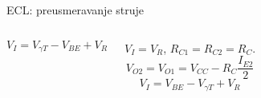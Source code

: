 \begin{frame}[label=10-s084]{ECL: preusmeravanje struje}
\setlength{\abovedisplayskip}{4pt}\setlength{\belowdisplayskip}{4pt}\setlength{\abovedisplayshortskip}{3pt}\setlength{\belowdisplayshortskip}{3pt}
\begin{columns}[T,onlytextwidth]\centering \raggedright{}
\[V_I=V_{\gamma T}-V_{BE}+V_R\]
\par $V_I=V_R$, $R_{C1}=R_{C2}=R_C$.
\[V_{O2}=V_{O1}=V_{CC}-R_C\frac{I_{E2}}2\]
\[V_I=V_{BE}-V_{\gamma T}+V_R\]\end{columns}
\end{frame}
